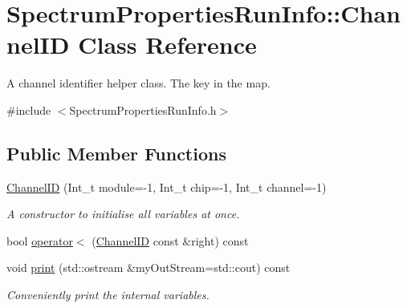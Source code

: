 \hypertarget{class_spectrum_properties_run_info_1_1_channel_i_d}{
\section{SpectrumPropertiesRunInfo::ChannelID Class Reference}
\label{class_spectrum_properties_run_info_1_1_channel_i_d}
}


A channel identifier helper class. The key in the map.  


{\ttfamily \#include $<$SpectrumPropertiesRunInfo.h$>$}\subsection*{Public Member Functions}
\begin{DoxyCompactItemize}
\item 
\hyperlink{class_spectrum_properties_run_info_1_1_channel_i_d_a6236116c05bc9cdd93fc5f2bc84a5401}{ChannelID} (Int\_\-t module=-\/1, Int\_\-t chip=-\/1, Int\_\-t channel=-\/1)
\begin{DoxyCompactList}\small\item\em A constructor to initialise all variables at once. \item\end{DoxyCompactList}\item 
bool \hyperlink{class_spectrum_properties_run_info_1_1_channel_i_d_a9edace27ee12f1a69137725dbdee49ef}{operator$<$} (\hyperlink{class_spectrum_properties_run_info_1_1_channel_i_d}{ChannelID} const \&right) const 
\item 
void \hyperlink{class_spectrum_properties_run_info_1_1_channel_i_d_a64f1597a30c83a3edae8673ed731df72}{print} (std::ostream \&myOutStream=std::cout) const 
\begin{DoxyCompactList}\small\item\em Conveniently print the internal variables. \item\end{DoxyCompactList}\end{DoxyCompactItemize}
